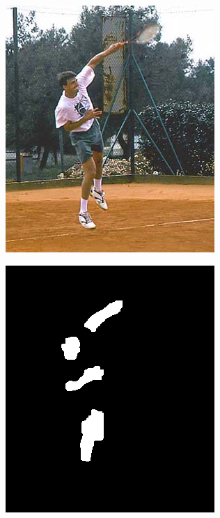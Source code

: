 \begin{figure}[h]
\begin{subfigure}[b]{0.18\textwidth}
         \includegraphics[width=\textwidth]{images/results/base_st/ivan1_x.png}
     \end{subfigure}
     \hfill
     \begin{subfigure}[b]{0.18\textwidth}
         \centering
         \includegraphics[width=\textwidth]{images/results/base_st/ivan1_y.png}

\end{subfigure}
\end{figure}
